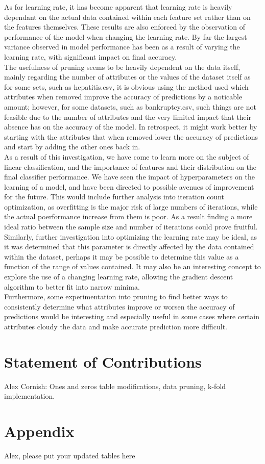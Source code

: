 As for learning rate, it has become apparent that learning rate is heavily dependant on the actual data contained within each feature set rather than on the features themselves. These results are also enforced by the observation of performance of the model when changing the learning rate. By far the largest variance observed in model performance has been as a result of varying the learning rate, with significant impact on final accuracy.\\

The usefulness of pruning seems to be heavily dependent on the data itself, mainly regarding the number of attributes or the values of the dataset itself as for some sets, such as hepatitis.csv, it is obvious using the method used which attributes when removed improve the accuracy of predictions by a noticable amount; however, for some datasets, such as bankruptcy.csv, such things are not feasible due to the number of attributes and the very limited impact that their absence has on the accuracy of the model. In retrospect, it might work better by starting with the attributes that when removed lower the accuracy of predictions and start by adding the other ones back in.\\

As a result of this investigation, we have come to learn more on the subject of linear classification, and the importance of features and their distribution on the final classifier performance. We have seen the impact of hyperparameters on the learning of a model, and have been directed to possible avenues of improvement for the future. This would include further analysis into iteration count optimization, as overfitting is the major risk of large numbers of iterations, while the actual poerformance increase from them is poor. As a result finding a more ideal ratio between the sample size and number of iterations could prove fruitful. Similarly, further investigation into optimizing the learning rate may be ideal, as it was determined that this parameter is directly affected by the data contained within the dataset, perhaps it may be possible to determine this value as a function of the range of values contained. It may also be an interesting concept to explore the use of a changing learning rate, allowing the gradient descent algorithm to better fit into narrow minima.\\

Furthermore, some experimentation into pruning to find better ways to consistently determine what attributes improve or worsen the accuracy of predictions would be interesting and especially useful in some cases where certain attributes cloudy the data and make accurate prediction more difficult.\\

\section{Statement of Contributions}

Alex Cornish: Ones and zeros table modifications, data pruning, k-fold implementation.

\section{Appendix}

Alex, please put your updated tables here 


